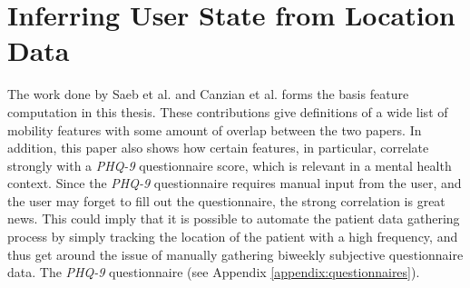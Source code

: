 \section{Inferring User State from Location Data}



The work done by Saeb et al. \cite{Saeb2015} and Canzian et al. \cite{Canzian2015} forms the basis feature computation in this thesis. These contributions give definitions of a wide list of mobility features with some amount of overlap between the two papers. In addition, this paper also shows how certain features, in particular, correlate strongly with a \textit{PHQ-9} questionnaire score, which is relevant in a mental health context. Since the \textit{PHQ-9} questionnaire requires manual input from the user, and the user may forget to fill out the questionnaire, the strong correlation is great news. This could imply that it is possible to automate the patient data gathering process by simply tracking the location of the patient with a high frequency, and thus get around the issue of manually gathering biweekly subjective questionnaire data. The \textit{PHQ-9} questionnaire (see Appendix \ref{appendix:questionnaires}).

